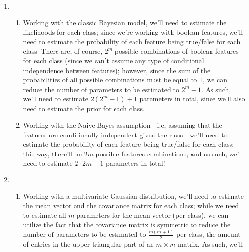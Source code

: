 \documentclass[12pt]{article}
\begin{document}
\begin{enumerate}[leftmargin=\labelsep]
        \begin{enumerate}
          \item {
                \begin{enumerate}
                  \item {
                        Working with the classic Bayesian model, we'll need to estimate
                        the likelihoods for each class; since we're working with boolean
                        features, we'll need to estimate the probability of each feature
                        being true/false for each class. There are, of course, $2^m$ possible
                        combinations of boolean features for each class (since we can't assume
                        any type of conditional independence between features); however, since
                        the sum of the probabilities of all possible combinations must
                        be equal to 1, we can reduce the number of parameters to be estimated
                        to $2^m - 1$. As such, we'll need to estimate $2(2^m - 1) + 1$ parameters
                        in total, since we'll also need to estimate the prior for each class.
                        }
                  \item {
                        Working with the Naive Bayes assumption - i.e, assuming that the features
                        are conditionally independent given the class - we'll need to estimate
                        the probability of each feature being true/false for each class;
                        this way, there'll be $2m$ possible features combinations, and as such,
                        we'll need to estimate $2 \cdot 2m + 1$ parameters in total!
                        }
                \end{enumerate}
                }
          \item {
                \begin{enumerate}
                  \item {
                        Working with a multivariate Gaussian distribution, we'll need to estimate
                        the mean vector and the covariance matrix for each class; while we need
                        to estimate all $m$ parameters for the mean vector (per class), we can utilize the
                        fact that the covariance matrix is symmetric to reduce the number of
                        parameters to be estimated to $\frac{m(m+1)}{2}$ per class, the amount of entries
                        in the upper triangular part of an $m \times m$ matrix. As such, we'll
}
\end{enumerate}}
\end{enumerate}
\end{enumerate}
\end{document}
